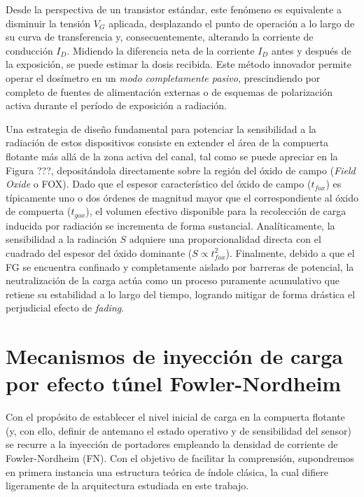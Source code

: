 \documentclass[12pt,a4paper,oneside]{book}
\begin{document}
Desde la perspectiva de un transistor estándar, este fenómeno es equivalente a disminuir la tensión $V_G$ aplicada, desplazando el punto de operación a lo largo de su curva de transferencia y, consecuentemente, alterando la corriente de conducción $I_D$. Midiendo la diferencia neta de la corriente $I_D$ antes y después de la exposición, se puede estimar la dosis recibida. Este método innovador permite operar el dosímetro en un \textit{modo completamente pasivo}, prescindiendo por completo de fuentes de alimentación externas o de esquemas de polarización activa durante el período de exposición a radiación.

Una estrategia de diseño fundamental para potenciar la sensibilidad a la radiación de estos dispositivos consiste en extender el área de la compuerta flotante más allá de la zona activa del canal, tal como se puede apreciar en la Figura ???, depositándola directamente sobre la región del óxido de campo (\textit{Field Oxide} o FOX). Dado que el espesor característico del óxido de campo ($t_{fox}$) es típicamente uno o dos órdenes de magnitud mayor que el correspondiente al óxido de compuerta ($t_{gox}$), el volumen efectivo disponible para la recolección de carga inducida por radiación se incrementa de forma sustancial. Analíticamente, la sensibilidad a la radiación $S$ adquiere una proporcionalidad directa con el cuadrado del espesor del óxido dominante ($S \propto t_{fox}^2$). Finalmente, debido a que el FG se encuentra confinado y completamente aislado por barreras de potencial, la neutralización de la carga actúa como un proceso puramente acumulativo que retiene su estabilidad a lo largo del tiempo, logrando mitigar de forma drástica el perjudicial efecto de \textit{fading}.

\section{Mecanismos de inyección de carga por efecto túnel Fowler-Nordheim}
Con el propósito de establecer el nivel inicial de carga en la compuerta flotante (y, con ello, definir de antemano el estado operativo y de sensibilidad del sensor) se recurre a la inyección de portadores empleando la densidad de corriente de Fowler-Nordheim (FN). Con el objetivo de facilitar la comprensión, supondremos en primera instancia una estructura teórica de índole clásica, la cual difiere ligeramente de la arquitectura estudiada en este trabajo.
\end{document}

